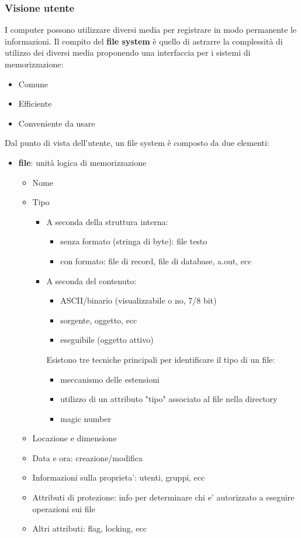 \documentclass[a4paper,12pt]{article}
\begin{document}
\subsubsection{Visione utente}
I computer possono utilizzare diversi media per registrare in modo permanente le informazioni. Il compito del \textbf{file system} è quello di astrarre la complessità di
utilizzo dei diversi media proponendo una interfaccia per i
sistemi di memorizzazione:
\begin{itemize}
  \item Comune
  \item Efficiente
  \item Conveniente da usare
\end{itemize}
Dal punto di vista dell’utente, un file system è composto da due elementi:
\begin{itemize}
  \item \textbf{file}: unità logica di memorizzazione
  \begin{itemize}
    \item Nome
    \item Tipo
    \begin{itemize}
      \item A seconda della struttura interna:
      \begin{itemize}
        \item senza formato (stringa di byte): file testo
        \item con formato: file di record, file di database, a.out, ecc
      \end{itemize}
      \item A seconda del contenuto:
      \begin{itemize}
        \item ASCII/binario (visualizzabile o no, 7/8 bit)
        \item sorgente, oggetto, ecc
        \item eseguibile (oggetto attivo)
      \end{itemize}
      Esistono tre tecniche principali per identificare il tipo di un file:
      \begin{itemize}
        \item meccanismo delle estensioni
        \item utilizzo di un attributo "tipo" associato al file nella directory
        \item magic number
      \end{itemize}
    \end{itemize}
    \item Locazione e dimensione
    \item Data e ora: creazione/modifica
    \item Informazioni sulla proprieta': utenti, gruppi, ecc
    \item Attributi di protezione: info per determinare chi e' autorizzato a eseguire operazioni sui file
    \item Altri attributi: flag, locking, ecc
  \end{itemize}

\end{itemize}
\end{document}
